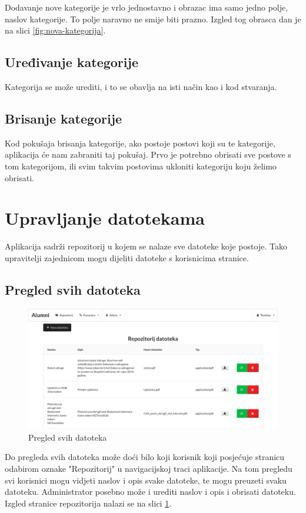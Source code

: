 \documentclass[zavrsni, numeric]{fer}
\begin{document}
Dodavanje nove kategorije je vrlo jednostavno i obrazac ima samo jedno polje, naslov kategorije. To polje naravno ne smije biti prazno. Izgled tog obrasca dan je na slici \ref{fig:nova-kategorija}.

\subsection{Uređivanje kategorije}
Kategorija se može urediti, i to se obavlja na isti način kao i kod stvaranja.

\subsection{Brisanje kategorije}
Kod pokušaja brisanja kategorije, ako postoje postovi koji su te kategorije, aplikacija će nam zabraniti taj pokušaj. Prvo je potrebno obrisati sve postove s tom kategorijom, ili svim takvim postovima ukloniti kategoriju koju želimo obrisati.

\section{Upravljanje datotekama}
Aplikacija sadrži repozitorij u kojem se nalaze sve datoteke koje postoje. Tako upravitelji zajednicom mogu dijeliti datoteke s korisnicima stranice.

\subsection{Pregled svih datoteka}

\begin{figure}[H]
	\centering
	\includegraphics[width=13cm]{slike/repozitorij.png}
	\caption{Pregled svih datoteka}
	\label{fig:repozitorij}
\end{figure}

Do pregleda svih datoteka može doći bilo koji korisnik koji posjećuje stranicu odabirom oznake "Repozitorij" u navigacijskoj traci aplikacije. Na tom pregledu svi korisnici mogu vidjeti naslov i opis svake datoteke, te mogu preuzeti svaku datoteku. Administrator posebno može i urediti naslov i opis i obrisati datoteku. Izgled stranice repozitorija nalazi se na slici \ref{fig:repozitorij}.
\end{document}
